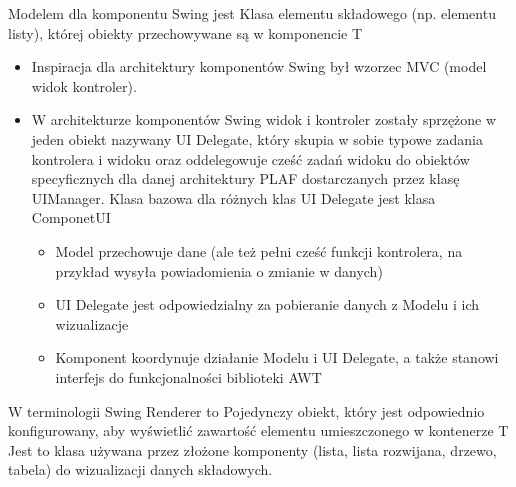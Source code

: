 \answer
{Modelem dla komponentu Swing jest}
{Klasa elementu składowego (np. elementu listy), której obiekty przechowywane są w komponencie}
{T}
{
\begin{itemize}
\item Inspiracja dla architektury komponentów Swing był wzorzec MVC (model widok kontroler).
\item W architekturze komponentów Swing widok i kontroler zostały sprzężone w jeden obiekt nazywany UI Delegate, który skupia w sobie typowe zadania kontrolera i widoku oraz oddelegowuje cześć zadań widoku do obiektów specyficznych dla danej architektury PLAF dostarczanych przez klasę UIManager. Klasa bazowa dla różnych klas UI Delegate jest klasa ComponetUI
\begin{itemize}
\item Model przechowuje dane (ale też pełni cześć funkcji kontrolera, na przykład wysyła powiadomienia o zmianie w danych)
\item UI Delegate jest odpowiedzialny za pobieranie danych z Modelu i ich wizualizacje
\item Komponent koordynuje działanie Modelu i UI Delegate, a także stanowi interfejs do funkcjonalności biblioteki AWT
\end{itemize}
\end{itemize}
}
{}

\answer
{W terminologii Swing Renderer to}
{ Pojedynczy obiekt, który jest odpowiednio konfigurowany, aby wyświetlić zawartość elementu umieszczonego w kontenerze}
{T}
{Jest to klasa używana przez złożone komponenty (lista, lista rozwijana, drzewo, tabela) do wizualizacji danych składowych.}
{}

